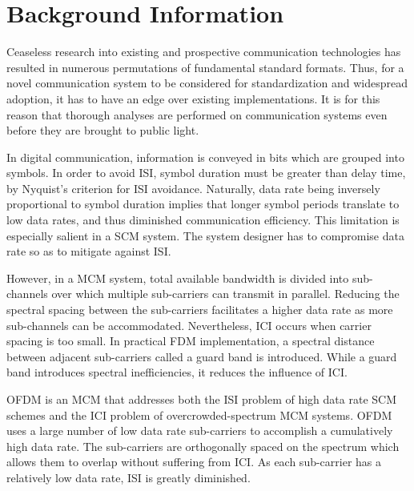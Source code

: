 \section{Background Information}
Ceaseless research into existing and prospective communication technologies has resulted in numerous permutations of fundamental standard formats. Thus, for a novel communication system to be considered for standardization and widespread adoption, it has to have an edge over existing implementations. It is for this reason that thorough analyses are performed on communication systems even before they are brought to public light.

In digital communication, information is conveyed in bits which are grouped into symbols. In order to avoid \gls{ISI}, symbol duration must be greater than delay time, by Nyquist's criterion for \gls{ISI} avoidance\cite{ofdm_intro}. Naturally, data rate being inversely proportional to symbol duration implies that longer symbol periods translate to low data rates, and thus diminished communication efficiency. This limitation is especially salient in a \gls{SCM} system. The system designer has to compromise data rate so as to mitigate against \gls{ISI}.

However, in a \gls{MCM} system, total available bandwidth is divided into sub-channels over which multiple sub-carriers can transmit in parallel. Reducing the spectral spacing between the sub-carriers facilitates a higher data rate as more sub-channels can be accommodated. Nevertheless, \gls{ICI} occurs when carrier spacing is too small. In practical \gls{FDM} implementation, a spectral distance between adjacent sub-carriers called a guard band is introduced. While a guard band introduces spectral inefficiencies, it reduces the influence of \gls{ICI}.

\gls{OFDM} is an \gls{MCM} that addresses both the \gls{ISI} problem of high data rate \gls{SCM} schemes and the \gls{ICI} problem of overcrowded-spectrum \gls{MCM} systems. \gls{OFDM} uses a large number of low data rate sub-carriers to accomplish a cumulatively high data rate. The sub-carriers are orthogonally spaced on the spectrum which allows them to overlap without suffering from \gls{ICI}. As each sub-carrier has a relatively low data rate, \gls{ISI} is greatly diminished.

